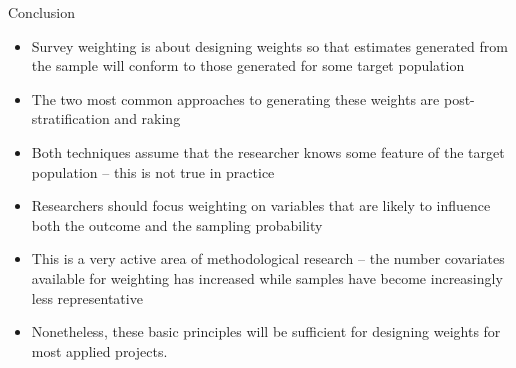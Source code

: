 \documentclass{beamer}
\begin{document}
\begin{frame}{Conclusion}
\begin{itemize}
	\item Survey weighting is about designing weights so that estimates generated from the sample will conform to those generated for some target population\pause 
	\item The two most common approaches to generating these weights are post-stratification and raking\pause 
	\item Both techniques assume that the researcher knows some feature of the target population -- this is not true in practice\pause 
	\item Researchers should focus weighting on variables that are likely to influence both the outcome and the sampling probability \pause 
	\item This is a very active area of methodological research -- the number covariates available for weighting has increased while samples have become increasingly less representative\pause 
	\item Nonetheless, these basic principles will be sufficient for designing weights for most applied projects.
\end{itemize}

\end{frame}
\end{document}
